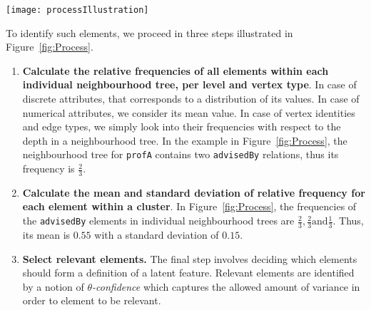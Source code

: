 \begin{sidewaysfigure}
	\centering
	\medskip
    \texttt{[image: processIllustration]}
    \caption[Discovering the meaning of latent features by analysing their relations]{\textbf{Discovering the meaning of latent features by analysing their relations.} Properties that describe latent features are the ones that have similar relative frequency in all neighbourhood trees. Starting from a cluster of instances viewed as neighbourhood trees (left), the relative frequencies of elements are calculated for each neighbourhood tree (middle). Next, the mean and standard deviation of relative frequencies are calculated for each individual element within the cluster (right). Which elements \textit{explain} the latent features is decided with $\theta$-confidence. Setting $\theta$ to 0.3 identifies \texttt{advisedBy} and \texttt{teaches} as relevant elements (in black).}
    \label{fig:Process}
\end{sidewaysfigure}





To identify such elements, we proceed in three steps illustrated in Figure~\ref{fig:Process}.
\begin{enumerate}
	\item \textbf{Calculate the relative frequencies of all elements within each individual neighbourhood tree, per level and vertex type}.
    	In case of discrete attributes, that corresponds to a distribution of its values.
		In case of numerical attributes, we consider its mean value.
		In case of vertex identities and edge types, we simply look into their frequencies with respect to the depth in a neighbourhood tree.
        In the example in Figure~\ref{fig:Process}, the neighbourhood tree for \texttt{profA} contains two \texttt{advisedBy} relations, thus its frequency is $\frac{2}{3}$.
    \item \textbf{Calculate the mean and standard deviation of relative frequency for each element within a cluster}.
        In Figure~\ref{fig:Process}, the frequencies of the \texttt{advisedBy} elements in individual neighbourhood trees are $\frac{2}{3}, \frac{2}{3} \text{and} \frac{1}{3}$. Thus, its mean is $0.55$ with a standard deviation of $0.15$.
    \item \textbf{Select relevant elements.}
    	The final step involves deciding which elements should form a definition of a latent feature.
        Relevant elements are identified by a notion of \textit{$\theta$-confidence} which captures the allowed amount of variance in order to element to be relevant.
\end{enumerate}


